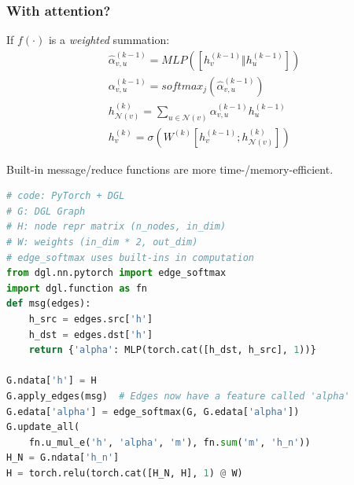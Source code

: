\documentclass[10pt,aspectratio=169]{beamer}
\begin{document}
	\begin{frame}[fragile]
	\frametitle{With attention?}
	\begin{minipage}{0.4\textwidth}
		If $f(\cdot)$ is a \emph{weighted} summation:
		$$
		\begin{gathered}
		\hat\alpha ^{(k-1)}_{v,u} = MLP\left(\left[h_v^{(k-1)} \Vert h_u^{(k-1)}\right]\right) \\
		\alpha^{(k-1)}_{v,u} = softmax_j\left(
		\hat\alpha ^{(k-1)}_{v,u}
		\right)\\
		h_{\mathcal{N}(v)}^{(k)} =
		\sum_{u \in \mathcal{N}(v)} \alpha^{(k-1)}_{v,u} h^{(k-1)}_u \\
		h^{(k)}_v =
		\sigma \left( W^{(k)} \left[h_v^{(k-1)}; h_{\mathcal{N}(v)}^{(k)}\right] \right)
		\end{gathered}
		$$
	\end{minipage}\hfill%
	\begin{minipage}{0.5\textwidth}
		Built-in message/reduce functions are more time-/memory-efficient.
\begin{lstlisting}[language=Python]
# code: PyTorch + DGL
# G: DGL Graph
# H: node repr matrix (n_nodes, in_dim)
# W: weights (in_dim * 2, out_dim)
# edge_softmax uses built-ins in computation
from dgl.nn.pytorch import edge_softmax
import dgl.function as fn
def msg(edges):
    h_src = edges.src['h']
    h_dst = edges.dst['h']
    return {'alpha': MLP(torch.cat([h_dst, h_src], 1))}

G.ndata['h'] = H
G.apply_edges(msg)  # Edges now have a feature called 'alpha'
G.edata['alpha'] = edge_softmax(G, G.edata['alpha'])
G.update_all(
    fn.u_mul_e('h', 'alpha', 'm'), fn.sum('m', 'h_n'))
H_N = G.ndata['h_n']
H = torch.relu(torch.cat([H_N, H], 1) @ W)
\end{lstlisting}
		\end{minipage}
	\end{frame}
\end{document}

